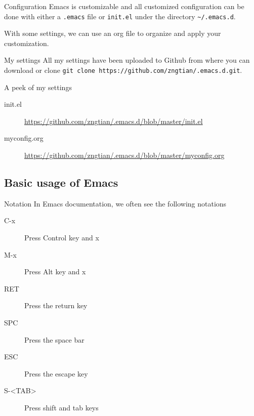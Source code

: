 \documentclass[presentation]{beamer}
\begin{document}
\begin{frame}[fragile,label={sec:org4682af3}]{Configuration}
 Emacs is customizable and all customized configuration can be done
with either a \texttt{.emacs} file or \texttt{init.el} under the directory
\texttt{\textasciitilde{}/.emacs.d}.

With some settings, we can use an org file to organize and apply your
customization.
\end{frame}

\begin{frame}[fragile,label={sec:org97334a0}]{My settings}
 All my settings have been uploaded to Github from where you can
download or clone \texttt{git clone
https://github.com/zngtian/.emacs.d.git}.

\begin{block}{A peek of my settings}
\begin{description}
\item[{init.el}] \url{https://github.com/zngtian/.emacs.d/blob/master/init.el}
\item[{myconfig.org}] \url{https://github.com/zngtian/.emacs.d/blob/master/myconfig.org}
\end{description}
\end{block}
\end{frame}


\subsection{Basic usage of Emacs}
\label{sec:org060d521}

\begin{frame}[label={sec:org1515216}]{Notation}
In Emacs documentation, we often see the following notations

\begin{description}
\item[{C-x}] Press Control key and x
\item[{M-x}] Press Alt key and x
\item[{RET}] Press the return key
\item[{SPC}] Press the space bar
\item[{ESC}] Press the escape key
\item[{S-<TAB>}] Press shift and tab keys
\end{description}
\end{frame}
\end{document}
